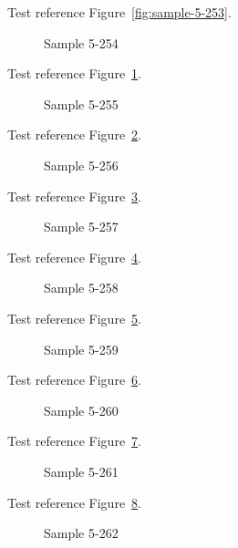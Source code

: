 Test reference Figure~\ref{fig:sample-5-253}.

\begin{figure}[tbhp]
\caption{Sample 5-254}
\label{fig:sample-5-254}
\end{figure}

Test reference Figure~\ref{fig:sample-5-254}.

\begin{figure}[tbhp]
\caption{Sample 5-255}
\label{fig:sample-5-255}
\end{figure}

Test reference Figure~\ref{fig:sample-5-255}.

\begin{figure}[tbhp]
\caption{Sample 5-256}
\label{fig:sample-5-256}
\end{figure}

Test reference Figure~\ref{fig:sample-5-256}.

\begin{figure}[tbhp]
\caption{Sample 5-257}
\label{fig:sample-5-257}
\end{figure}

Test reference Figure~\ref{fig:sample-5-257}.

\begin{figure}[tbhp]
\caption{Sample 5-258}
\label{fig:sample-5-258}
\end{figure}

Test reference Figure~\ref{fig:sample-5-258}.

\begin{figure}[tbhp]
\caption{Sample 5-259}
\label{fig:sample-5-259}
\end{figure}

Test reference Figure~\ref{fig:sample-5-259}.

\begin{figure}[tbhp]
\caption{Sample 5-260}
\label{fig:sample-5-260}
\end{figure}

Test reference Figure~\ref{fig:sample-5-260}.

\begin{figure}[tbhp]
\caption{Sample 5-261}
\label{fig:sample-5-261}
\end{figure}

Test reference Figure~\ref{fig:sample-5-261}.

\begin{figure}[tbhp]
\caption{Sample 5-262}
\label{fig:sample-5-262}
\end{figure}

